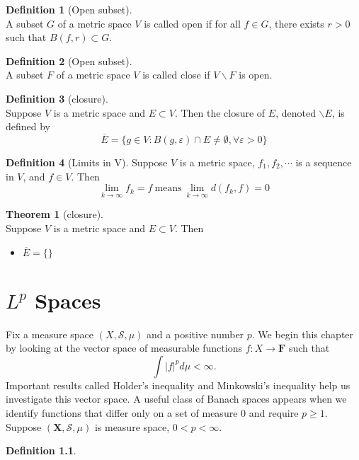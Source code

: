 \documentclass[12pt]{book}
\theoremstyle{definition}
\newtheorem{definition}{Definition}[chapter]
\newtheorem{theorem}{Theorem}[chapter]
\newcommand{\X}{\mathbf{X}}
\begin{document}
\begin{definition}[Open subset] \ \\
A subset $G$ of a metric space $V$ is called open if for all $f\in G$, there exists $r >0$ such that $B(f,r)\subset G$.
\end{definition}

\begin{definition}[Open subset] \ \\
A subset $F$ of a metric space $V$ is called close if $V\backslash F$ is open.
\end{definition}

\begin{definition}[closure] \ \\
Suppose $V$ is a metric space and $E\subset V$. Then the closure of $E$, denoted $\backslash E$, is defined by
$$
\overline{E} = \{g \in V: B(g,\varepsilon)\cap E \neq \emptyset,  \forall \varepsilon > 0\}
$$
\end{definition}

\begin{definition}[Limits in V]
Suppose $V$ is a metric space, $f_1,f_2,\cdots$ is a sequence in $V$, and $f\in V$. Then
	$$
\lim_{k \to \infty}f_k =f \ \text{means} \ \lim_{k \to \infty}d(f_k,f)=0
	$$
\end{definition}

\begin{theorem}[closure] \ \\
Suppose $V$ is a metric space and $E \subset V$. Then
\begin{itemize}
	\item $\overline{E}=\{ \}$
\end{itemize}	
\end{theorem}








\chapter{$L^p$ Spaces}
Fix a measure space $(X, \mathcal{S}, \mu)$ and a positive number $p$. We begin this chapter by looking at the vector space of measurable functions $f: X \rightarrow \mathbf{F}$ such that
$$
\int|f|^p d \mu<\infty .
$$
Important results called Holder's inequality and Minkowski's inequality help us investigate this vector space. A useful class of Banach spaces appears when we identify functions that differ only on a set of measure 0 and require $p \geq 1$.
\newpage
Suppose $(\X,\mathcal{S},\mu)$ is measure space, $0<p<\infty$.
\begin{definition}
	
\end{definition}
\end{document}
